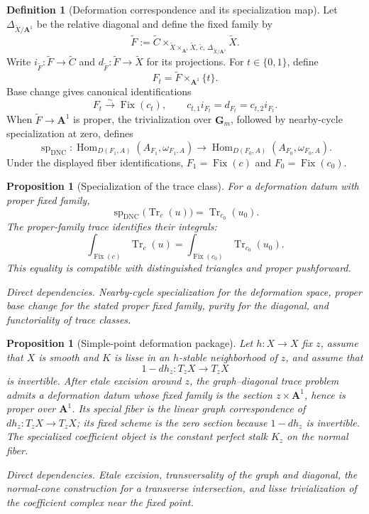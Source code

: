 \documentclass[10pt]{article}
\newtheorem{proposition}[theorem]{Proposition}
\theoremstyle{definition}
\newtheorem{definition}[theorem]{Definition}
\newcommand{\Fix}{\operatorname{Fix}}
\newcommand{\Hom}{\operatorname{Hom}}
\newcommand{\depends}[1]{\par\smallskip\noindent\textit{Direct dependencies.} #1\par}
\begin{document}
\begin{definition}[Deformation correspondence and its specialization map]
\fi
Let \(\Delta_{\widetilde X/\mathbf A^1}\) be the relative diagonal and
define the fixed family by
\[
 \widetilde F:=
 \widetilde C\times_{\widetilde X\times_{\mathbf A^1}\widetilde X,\,
 \widetilde c,\,\Delta_{\widetilde X/\mathbf A^1}}\widetilde X.
\]
Write \(i_{\widetilde F}:\widetilde F\to\widetilde C\) and
\(d_{\widetilde F}:\widetilde F\to\widetilde X\) for its projections.
For \(t\in\{0,1\}\), define
\[
 F_t=\widetilde F\times_{\mathbf A^1}\{t\}.
\]
Base change gives canonical identifications
\[
 F_t\xrightarrow{\sim}\Fix(c_t),
 \qquad c_{t,1}i_{F_t}=d_{F_t}=c_{t,2}i_{F_t}.
\]
When
\(\widetilde F\to\mathbf A^1\) is proper, the trivialization over
\(\mathbf G_m\), followed by nearby-cycle specialization at zero, defines
\[
 \operatorname{sp}_{\mathrm{DNC}}:
 \Hom_{D(F_1,A)}(A_{F_1},\omega_{F_1,A})
 \longrightarrow
 \Hom_{D(F_0,A)}(A_{F_0},\omega_{F_0,A}).
\]
Under the displayed fiber identifications, \(F_1=\Fix(c)\) and
\(F_0=\Fix(c_0)\).
\end{definition}

\begin{proposition}[Specialization of the trace class]
For a deformation datum with proper fixed family,
\[
 \operatorname{sp}_{\mathrm{DNC}}
 \bigl(\operatorname{Tr}_c(u)\bigr)=
 \operatorname{Tr}_{c_0}(u_0).
\]
The proper-family trace identifies their integrals:
\[
 \int_{\Fix(c)}\operatorname{Tr}_c(u)=
 \int_{\Fix(c_0)}\operatorname{Tr}_{c_0}(u_0).
\]
This equality is compatible with distinguished triangles and proper
pushforward.
\depends{Nearby-cycle specialization for the deformation space, proper
base change for the stated proper fixed family, purity for the diagonal,
and functoriality of trace classes.}
\end{proposition}

\begin{proposition}[Simple-point deformation package]
Let \(h:X\to X\) fix \(z\), assume that \(X\) is smooth and \(K\) is
lisse in an \(h\)-stable neighborhood of \(z\), and assume that
\[
 1-dh_z:T_zX\longrightarrow T_zX
\]
is invertible.  After etale excision around \(z\), the graph--diagonal
trace problem admits a deformation datum whose fixed family is the section
\(z\times\mathbf A^1\), hence is proper over \(\mathbf A^1\).  Its special
fiber is the linear graph correspondence of
\(dh_z:T_zX\to T_zX\); its fixed scheme is the zero section because
\(1-dh_z\) is invertible.  The specialized coefficient object is the
constant perfect stalk \(K_z\) on the normal fiber.
\depends{Etale excision, transversality of the graph and diagonal, the
normal-cone construction for a transverse intersection, and lisse
trivialization of the coefficient complex near the fixed point.}
\end{proposition}
\end{document}

